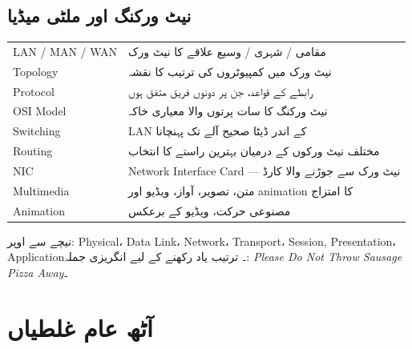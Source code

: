\subsection*{نیٹ ورکنگ اور ملٹی میڈیا}

\begin{center}
\begin{tabular}{@{}p{4.0cm} p{10.4cm}@{}}
\toprule
\textenglish{LAN / MAN / WAN} & مقامی / شہری / وسیع علاقے کا نیٹ ورک \\
\textenglish{Topology} & نیٹ ورک میں کمپیوٹروں کی ترتیب کا نقشہ \\
\textenglish{Protocol} & رابطے کے قواعد، جن پر دونوں فریق متفق ہوں \\
\textenglish{OSI Model} & نیٹ ورکنگ کا سات پرتوں والا معیاری خاکہ \\
\textenglish{Switching} & \textenglish{LAN} کے اندر ڈیٹا صحیح آلے تک پہنچانا \\
\textenglish{Routing} & مختلف نیٹ ورکوں کے درمیان بہترین راستے کا انتخاب \\
\textenglish{NIC} & \textenglish{Network Interface Card} --- نیٹ ورک سے جوڑنے والا کارڈ \\
\textenglish{Multimedia} & متن، تصویر، آواز، ویڈیو اور \textenglish{animation} کا امتزاج \\
\textenglish{Animation} & مصنوعی حرکت، ویڈیو کے برعکس \\
\bottomrule
\end{tabular}
\end{center}

\medskip
\begin{nukta}
نیچے سے اوپر: \textenglish{Physical}، \textenglish{Data Link}،
\textenglish{Network}، \textenglish{Transport}، \textenglish{Session},
\textenglish{Presentation}، \textenglish{Application}۔ ترتیب یاد رکھنے کے لیے
انگریزی جملہ: \textenglish{\emph{Please Do Not Throw Sausage Pizza Away}}۔
\end{nukta}

\clearpage

\section*{آٹھ عام غلطیاں}


